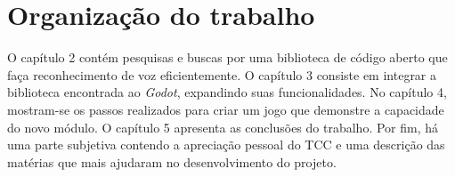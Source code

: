 
\section{Organização do trabalho}

O capítulo 2 contém pesquisas e buscas por uma biblioteca de código aberto que faça
reconhecimento de voz eficientemente. O capítulo 3 consiste em integrar a biblioteca
encontrada ao \emph{Godot}, expandindo suas funcionalidades. No capítulo 4,
mostram-se os passos realizados para criar um jogo que demonstre a capacidade do
novo módulo. O capítulo 5 apresenta as conclusões do trabalho. Por fim, há uma parte
subjetiva contendo a apreciação pessoal do TCC e uma descrição das matérias que mais
ajudaram no desenvolvimento do projeto.
